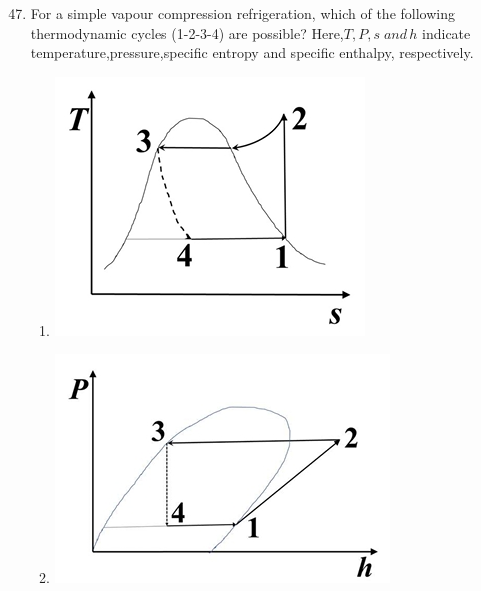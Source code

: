 \documentclass[journal]{IEEEtran}
\theoremstyle{remark}
\begin{document}
\begin{enumerate}[itemsep=1em]
\setcounter{enumi}{46}
\item For a simple vapour compression refrigeration, which of the following thermodynamic cycles (1-2-3-4) are possible? Here,$T,P,s\;and\,h$ indicate temperature,pressure,specific entropy and specific enthalpy, respectively.
\begin{multicols}{4}
\begin{enumerate}
    \item \begin{minipage}[t]{0.2\textwidth}
    \vspace{0pt}
        \includegraphics[width=\columnwidth]{figs/fig-8.jpeg}
        \label{fig-11}
    \end{minipage}
    \item \begin{minipage}[t]{0.2\textwidth}
    \vspace{0pt}
        \includegraphics[width=\columnwidth]{figs/fig-9.jpeg}

\end{minipage}
\end{enumerate}
\end{multicols}
\end{enumerate}
\end{document}

